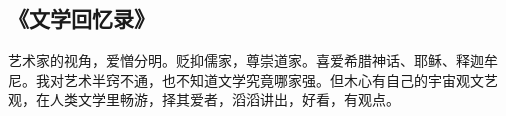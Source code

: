 \subsection{《文学回忆录》}
艺术家的视角，爱憎分明。贬抑儒家，尊崇道家。喜爱希腊神话、耶稣、释迦牟尼。我对艺术半窍不通，也不知道文学究竟哪家强。但木心有自己的宇宙观文艺观，在人类文学里畅游，择其爱者，滔滔讲出，好看，有观点。